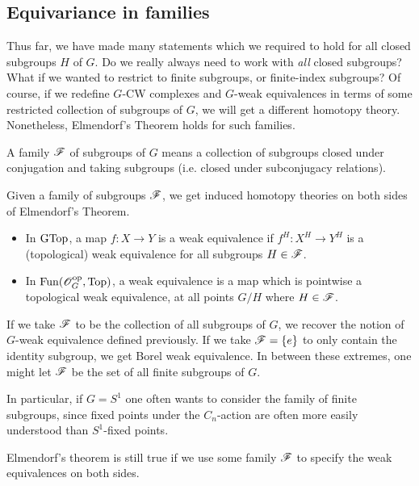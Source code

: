\subsection{Equivariance in families}

Thus far, we have made many statements which we required to hold for all closed subgroups $H$ of $G$. Do we really always need to work with \emph{all} closed subgroups? What if we wanted to restrict to finite subgroups, or finite-index subgroups? Of course, if we redefine $G$-CW complexes and $G$-weak equivalences in terms of some restricted collection of subgroups of $G$, we will get a different homotopy theory. Nonetheless, Elmendorf's Theorem holds for such families.

\begin{defn} A family $\mathscr{F}$ of subgroups of $G$ means a collection of subgroups closed under conjugation and taking subgroups (i.e. closed under subconjugacy relations).
\end{defn}

Given a family of subgroups $\mathscr{F}$, we get induced homotopy theories on both sides of Elmendorf's Theorem.
\begin{itemize}
    \item In $\operatorname{GTop}$, a map $f: X \to Y$ is a weak equivalence if $f^H: X^H \to Y^H$ is a (topological) weak equivalence for all subgroups $H \in \mathscr{F}$. 
    \item In $\operatorname{Fun}(\mathscr{O}_G^{\operatorname{op}}, \operatorname{Top})$, a weak equivalence is a map which is pointwise a topological weak equivalence, at all points $G/H$ where $H \in \mathscr{F}$. 
\end{itemize}

\begin{example}
    If we take $\mathscr{F}$ to be the collection of all subgroups of $G$, we recover the notion of $G$-weak equivalence defined previously. If we take $\mathscr{F} = \{e\}$ to only contain the identity subgroup, we get Borel weak equivalence. In between these extremes, one might let $\mathscr{F}$ be the set of all finite subgroups of $G$.
\end{example}

In particular, if $G = S^1$ one often wants to consider the family of finite subgroups, since fixed points under the $C_n$-action are often more easily understood than $S^1$-fixed points. 

\begin{remark}
    Elmendorf's theorem is still true if we use some family $\mathscr{F}$ to specify the weak equivalences on both sides. 
\end{remark}

